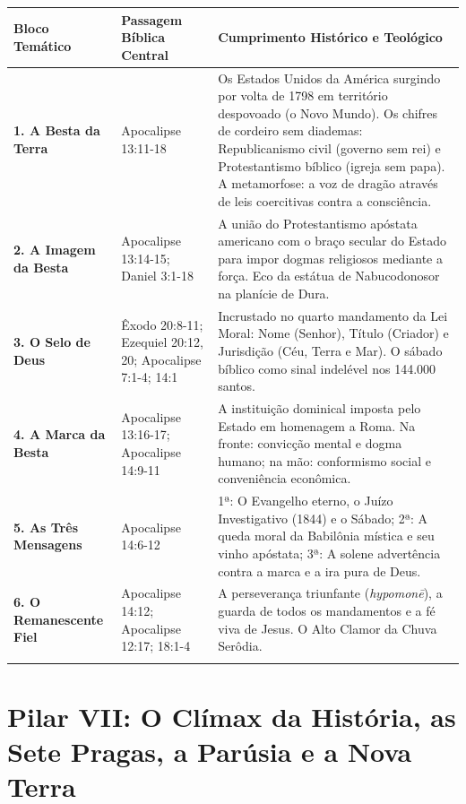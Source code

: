 \documentclass[11pt,a4paper,openany]{book}
\begin{document}
\begin{table}[htbp]
\centering
\footnotesize
\setlength{\tabcolsep}{5pt}
\renewcommand{\arraystretch}{1.25}
\begin{tabularx}{\textwidth}{>{\raggedright\arraybackslash}p{} >{\raggedright\arraybackslash}X >{\raggedright\arraybackslash}X}
\toprule
\textbf{Bloco Temático} & \textbf{Passagem Bíblica Central} & \textbf{Cumprimento Histórico e Teológico} \\
\midrule
\textbf{1. A Besta da Terra} & Apocalipse 13:11-18 & Os Estados Unidos da América surgindo por volta de 1798 em território despovoado (o Novo Mundo). Os chifres de cordeiro sem diademas: Republicanismo civil (governo sem rei) e Protestantismo bíblico (igreja sem papa). A metamorfose: a voz de dragão através de leis coercitivas contra a consciência. \\
\addlinespace[3pt]
\textbf{2. A Imagem da Besta} & Apocalipse 13:14-15; Daniel 3:1-18 & A união do Protestantismo apóstata americano com o braço secular do Estado para impor dogmas religiosos mediante a força. Eco da estátua de Nabucodonosor na planície de Dura. \\
\addlinespace[3pt]
\textbf{3. O Selo de Deus} & Êxodo 20:8-11; Ezequiel 20:12, 20; Apocalipse 7:1-4; 14:1 & Incrustado no quarto mandamento da Lei Moral: Nome (Senhor), Título (Criador) e Jurisdição (Céu, Terra e Mar). O sábado bíblico como sinal indelével nos 144.000 santos. \\
\addlinespace[3pt]
\textbf{4. A Marca da Besta} & Apocalipse 13:16-17; Apocalipse 14:9-11 & A instituição dominical imposta pelo Estado em homenagem a Roma. Na fronte: convicção mental e dogma humano; na mão: conformismo social e conveniência econômica. \\
\addlinespace[3pt]
\textbf{5. As Três Mensagens} & Apocalipse 14:6-12 & 1ª: O Evangelho eterno, o Juízo Investigativo (1844) e o Sábado; 2ª: A queda moral da Babilônia mística e seu vinho apóstata; 3ª: A solene advertência contra a marca e a ira pura de Deus. \\
\addlinespace[3pt]
\textbf{6. O Remanescente Fiel} & Apocalipse 14:12; Apocalipse 12:17; 18:1-4 & A perseverança triunfante (\textit{hypomonē}), a guarda de todos os mandamentos e a fé viva de Jesus. O Alto Clamor da Chuva Serôdia. \\
\addlinespace[3pt]
\bottomrule
\end{tabularx}
\end{table}

\chapter{Pilar VII: O Clímax da História, as Sete Pragas, a Parúsia e a Nova Terra}
\end{document}

